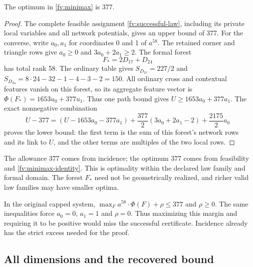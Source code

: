 \begin{proposition}\label{fv:exact-minimax}
The optimum in \eqref{fv:minimax} is 377.
\end{proposition}

\begin{proof}
The complete feasible assignment \eqref{fv:successful-law}, including
its private local variables and all network potentials, gives an upper
bound of 377. For the converse, write $a_0,a_1$ for coordinates 0 and
1 of $a^{58}$. The retained corner and triangle rows give
$a_0\ge0$ and $3a_0+2a_1\ge2$.
The formal forest
\[
                    F_*=2D_{17}+D_{24}
\]
has total rank 58. The ordinary table gives
$S_{D_{17}}=227/2$ and
$S_{D_{24}}=8\cdot24-32-1-4-3-2=150$. All ordinary cross
and contextual features vanish on this forest, so its aggregate
feature vector is
$\Phi(F_*)=1653u_0+377u_1$. Thus one path bound gives
$U\ge1653a_0+377a_1$. The exact nonnegative combination
\begin{equation}\label{fv:minimax-identity}
 U-377=(U-1653a_0-377a_1)
 +\frac{377}{2}(3a_0+2a_1-2)+\frac{2175}{2}a_0
\end{equation}
proves the lower bound: the first term is the sum of this forest's
network rows and its link to $U$, and the other terms are multiples
of the two local rows.
\end{proof}

The allowance 377 comes from incidence; the optimum 377 comes from
feasibility and \eqref{fv:minimax-identity}. This is optimality within
the declared law family and formal domain. The forest $F_*$ need not
be geometrically realized, and richer valid law families may have
smaller optima.

In the original capped system,
$\max_Fa^{58}\cdot\Phi(F)+\rho\le377$ and $\rho\ge0$.
The same inequalities force $a_0=0$, $a_1=1$ and $\rho=0$.
Thus maximizing this margin and requiring it to be positive would
miss the successful certificate. Incidence already has the strict
excess needed for the proof.

\subsection{All dimensions and the recovered bound}
\label{fv:all-dimensions}

